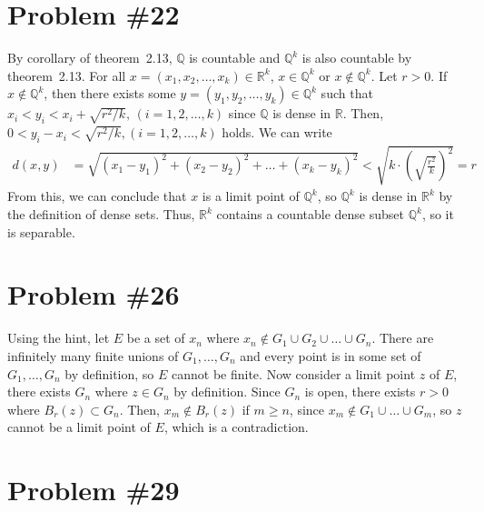 \documentclass{scrartcl}
\begin{document}
\section{Problem \#22}
By corollary of theorem~2.13, \(\mathbb{Q}\) is countable and \(\mathbb{Q}^k\) is also countable by theorem~2.13.
For all \(x = (x_1, x_2, \dots, x_k) \in \mathbb{R}^k\), \(x \in \mathbb{Q}^k\) or \(x \not \in \mathbb{Q}^k\).
Let \(r > 0\).
If \(x \not \in \mathbb{Q}^k\), then there exists some \(y = (y_1, y_2, \dots, y_k) \in \mathbb{Q}^k\) such that \(x_i < y_i < x_i + \sqrt{r^2 / k},\, (i = 1, 2, \dots, k)\) since \(\mathbb{Q}\) is dense in \(\mathbb{R}\).
Then, \(0 < y_i - x_i < \sqrt{r^2 / k}, (i = 1, 2, \dots, k)\) holds.
We can write
\begin{align*}
  d(x, y) &= \sqrt{(x_1 - y_1)^2 + (x_2 - y_2)^2 + \dots + (x_k - y_k)^2} < \sqrt{k \cdot \left( \sqrt{\frac{r^2}{k}} \right)^2} = r
\end{align*}
From this, we can conclude that \(x\) is a limit point of \(\mathbb{Q}^k\), so \(\mathbb{Q}^k\) is dense in \(\mathbb{R}^k\) by the definition of dense sets.
Thus, \(\mathbb{R}^k\) contains a countable dense subset \(\mathbb{Q}^k\), so it is separable.

\section{Problem \#26}
Using the hint, let \(E\) be a set of \(x_n\) where \(x_n \not \in G_1 \cup G_2 \cup \dots \cup G_n\).
There are infinitely many finite unions of \(G_1, \dots, G_n\) and every point is in some set of \(G_1, \dots, G_n\) by definition, so \(E\) cannot be finite.
Now consider a limit point \(z\) of \(E\), there exists \(G_n\) where \(z \in G_n\) by definition.
Since \(G_n\) is open, there exists \(r > 0\) where \(B_r(z) \subset G_n\).
Then, \(x_m \not \in B_r(z)\) if \(m \geq n\), since \(x_m \not \in G_1 \cup \dots \cup G_m\), so \(z\) cannot be a limit point of \(E\), which is a contradiction.

\section{Problem \#29}
\end{document}
